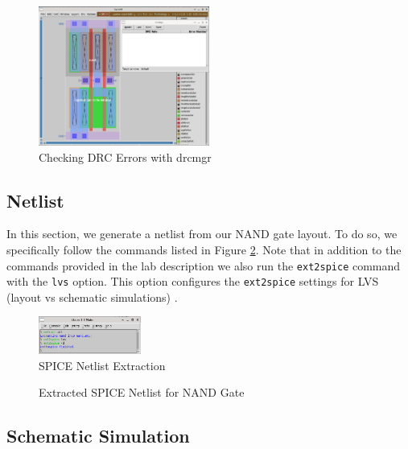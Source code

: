 \documentclass{article}
\begin{document}
	\begin{figure}[H]
		\centerline{\includegraphics[width=0.5\textwidth]{nand_drc_errors_drcmgr.png}}
		\caption{Checking DRC Errors with drcmgr}
		\label{fig::nand_drc_errors_drcmgr}
	\end{figure}
	
	\subsection{Netlist}
	
	In this section, we generate a netlist from our NAND gate layout. To do so, we specifically follow the commands listed in Figure \ref{fig::nand_netlist_creation}. Note that in addition to the commands provided in the lab description we also run the \texttt{ext2spice} command with the \texttt{lvs} option. This option configures the \texttt{ext2spice} settings for LVS (layout vs schematic simulations) \cite{a2021_magic83}.
	
	\begin{figure}[H]
		\centerline{\includegraphics[width=0.3\textwidth]{nand_netlist_creation.png}}
		\caption{SPICE Netlist Extraction}
		\label{fig::nand_netlist_creation}
	\end{figure}
	
	\begin{figure}[H]
		
		\caption{Extracted SPICE Netlist for NAND Gate}
		\label{fig::nand_netlist}
	\end{figure}
	
	\subsection{Schematic Simulation}
	
\end{document}
